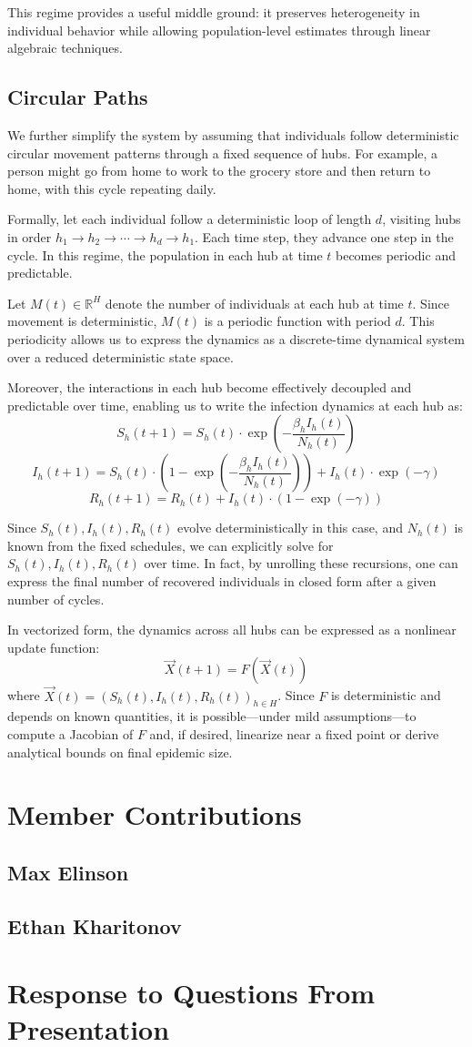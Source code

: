 \documentclass[12pt]{article}
\begin{document}
This regime provides a useful middle ground: it preserves heterogeneity in individual behavior while allowing population-level estimates through linear algebraic techniques.


\subsection{Circular Paths}
We further simplify the system by assuming that individuals follow deterministic circular movement patterns through a fixed sequence of hubs. For example, a person might go from home to work to the grocery store and then return to home, with this cycle repeating daily. 

Formally, let each individual follow a deterministic loop of length $d$, visiting hubs in order $h_1 \rightarrow h_2 \rightarrow \cdots \rightarrow h_d \rightarrow h_1$. Each time step, they advance one step in the cycle. In this regime, the population in each hub at time $t$ becomes periodic and predictable.

Let $M(t) \in \mathbb{R}^{H}$ denote the number of individuals at each hub at time $t$. Since movement is deterministic, $M(t)$ is a periodic function with period $d$. This periodicity allows us to express the dynamics as a discrete-time dynamical system over a reduced deterministic state space.

Moreover, the interactions in each hub become effectively decoupled and predictable over time, enabling us to write the infection dynamics at each hub as:
\[
S_h(t+1) = S_h(t) \cdot \exp\left(-\frac{\beta_h I_h(t)}{N_h(t)}\right)
\]
\[
I_h(t+1) = S_h(t) \cdot \left(1 - \exp\left(-\frac{\beta_h I_h(t)}{N_h(t)}\right)\right) + I_h(t) \cdot \exp(-\gamma)
\]
\[
R_h(t+1) = R_h(t) + I_h(t) \cdot \left(1 - \exp(-\gamma)\right)
\]

Since $S_h(t), I_h(t), R_h(t)$ evolve deterministically in this case, and $N_h(t)$ is known from the fixed schedules, we can explicitly solve for $S_h(t), I_h(t), R_h(t)$ over time. In fact, by unrolling these recursions, one can express the final number of recovered individuals in closed form after a given number of cycles.

In vectorized form, the dynamics across all hubs can be expressed as a nonlinear update function:
\[
\vec{X}(t+1) = F(\vec{X}(t))
\]
where $\vec{X}(t) = (S_h(t), I_h(t), R_h(t))_{h \in H}$. Since $F$ is deterministic and depends on known quantities, it is possible—under mild assumptions—to compute a Jacobian of $F$ and, if desired, linearize near a fixed point or derive analytical bounds on final epidemic size.



\section{Member Contributions}
\subsection{Max Elinson}

\subsection{Ethan Kharitonov}

\section{Response to Questions From Presentation}
\end{document}
